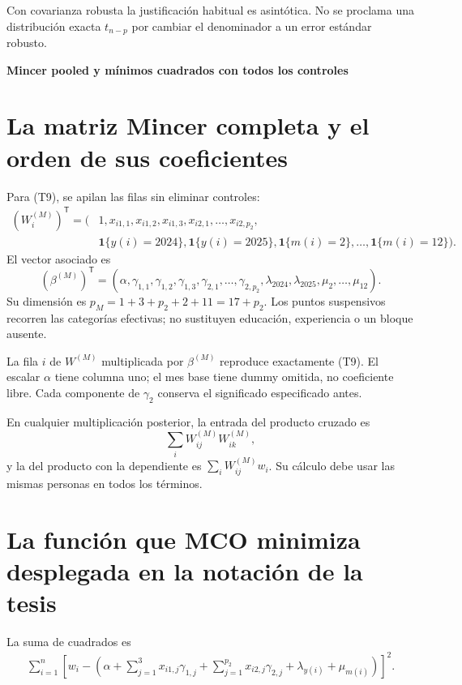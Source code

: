 \documentclass[11pt,a4paper]{article}
\begin{document}
Con covarianza robusta la justificación habitual es asintótica. No se proclama una distribución exacta $t_{n-p}$ por cambiar el denominador a un error estándar robusto.

\clearpage
{}
{\large\bfseries\color{azul}Mincer pooled y mínimos cuadrados con todos los controles}\par\vspace{2mm}
\section{La matriz Mincer completa y el orden de sus coeficientes}

Para (T9), se apilan las filas sin eliminar controles:
\[
\begin{aligned}
(W_i^{(M)})^{\mathsf T}=
(&1,x_{i1,1},x_{i1,2},x_{i1,3},
x_{i2,1},\ldots,x_{i2,p_2},\\
&\mathbf1\{y(i)=2024\},\mathbf1\{y(i)=2025\},
\mathbf1\{m(i)=2\},\ldots,\mathbf1\{m(i)=12\}).
\end{aligned}
\]
El vector asociado es
\[
(\beta^{(M)})^{\mathsf T}
=(\alpha,\gamma_{1,1},\gamma_{1,2},\gamma_{1,3},
\gamma_{2,1},\ldots,\gamma_{2,p_2},
\lambda_{2024},\lambda_{2025},\mu_2,\ldots,\mu_{12}).
\]
Su dimensión es $p_M=1+3+p_2+2+11=17+p_2$. Los puntos suspensivos recorren las categorías efectivas; no sustituyen educación, experiencia o un bloque ausente.

La fila $i$ de $W^{(M)}$ multiplicada por $\beta^{(M)}$ reproduce exactamente (T9). El escalar $\alpha$ tiene columna uno; el mes base tiene dummy omitida, no coeficiente libre. Cada componente de $\gamma_2$ conserva el significado especificado antes.

En cualquier multiplicación posterior, la entrada del producto cruzado es
\[
\sum_iW_{ij}^{(M)}W_{ik}^{(M)},
\]
y la del producto con la dependiente es $\sum_iW_{ij}^{(M)}w_i$. Su cálculo debe usar las mismas personas en todos los términos.

\clearpage
\section{La función que MCO minimiza desplegada en la notación de la tesis}
La suma de cuadrados es
\[
\begin{aligned}\sum_{i=1}^n\left[w_i-\left(\alpha+\sum_{j=1}^{3}x_{i1,j}\gamma_{1,j}+\sum_{j=1}^{p_2}x_{i2,j}\gamma_{2,j}+\lambda_{y(i)}+\mu_{m(i)}\right)\right]^2.\end{aligned}
\]
\end{document}
